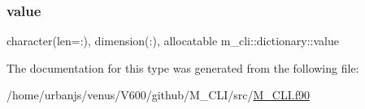 \subsubsection{\texorpdfstring{value}{value}}
{\footnotesize\ttfamily character(len=\+:), dimension(\+:), allocatable m\+\_\+cli\+::dictionary\+::value\hspace{0.3cm}{\ttfamily [private]}}



The documentation for this type was generated from the following file\+:\begin{DoxyCompactItemize}
\item 
/home/urbanjs/venus/\+V600/github/\+M\+\_\+\+C\+L\+I/src/\mbox{\hyperlink{M__CLI_8f90}{M\+\_\+\+C\+L\+I.\+f90}}\end{DoxyCompactItemize}
